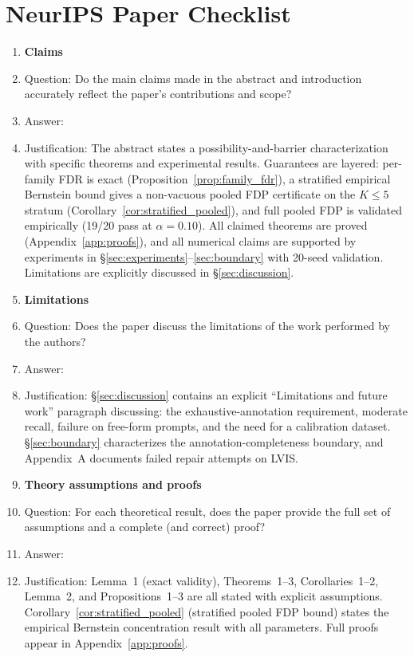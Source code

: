 \section*{NeurIPS Paper Checklist}

\begin{enumerate}

\item {\bf Claims}
    \item[] Question: Do the main claims made in the abstract and introduction accurately reflect the paper's contributions and scope?
    \item[] Answer: \answerYes{}
    \item[] Justification: The abstract states a possibility-and-barrier characterization with specific theorems and experimental results. Guarantees are layered: per-family FDR is exact (Proposition~\ref{prop:family_fdr}), a stratified empirical Bernstein bound gives a non-vacuous pooled FDP certificate on the $K\!\le\!5$ stratum (Corollary~\ref{cor:stratified_pooled}), and full pooled FDP is validated empirically (19/20 pass at $\alpha\!=\!0.10$). All claimed theorems are proved (Appendix~\ref{app:proofs}), and all numerical claims are supported by experiments in \S\ref{sec:experiments}--\ref{sec:boundary} with 20-seed validation. Limitations are explicitly discussed in \S\ref{sec:discussion}.

\item {\bf Limitations}
    \item[] Question: Does the paper discuss the limitations of the work performed by the authors?
    \item[] Answer: \answerYes{}
    \item[] Justification: \S\ref{sec:discussion} contains an explicit ``Limitations and future work'' paragraph discussing: the exhaustive-annotation requirement, moderate recall, failure on free-form prompts, and the need for a calibration dataset. \S\ref{sec:boundary} characterizes the annotation-completeness boundary, and Appendix~A documents failed repair attempts on LVIS.

\item {\bf Theory assumptions and proofs}
    \item[] Question: For each theoretical result, does the paper provide the full set of assumptions and a complete (and correct) proof?
    \item[] Answer: \answerYes{}
    \item[] Justification: Lemma~1 (exact validity), Theorems~1--3, Corollaries~1--2, Lemma~2, and Propositions~1--3 are all stated with explicit assumptions. Corollary~\ref{cor:stratified_pooled} (stratified pooled FDP bound) states the empirical Bernstein concentration result with all parameters. Full proofs appear in Appendix~\ref{app:proofs}.


\end{enumerate}
